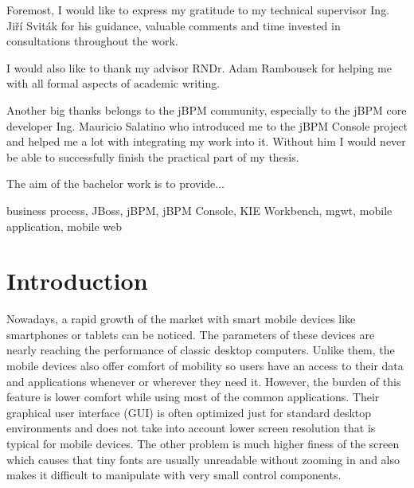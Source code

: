 \documentclass[12pt,oneside,final]{fithesis2}
\begin{document}
\FrontMatter
\ThesisTitlePage

\begin{ThesisDeclaration}
\DeclarationText
\AdvisorName
\end{ThesisDeclaration}

\begin{ThesisThanks}
Foremost, I would like to express my gratitude to my technical supervisor Ing. Jiří Sviták for his guidance, valuable comments and time invested in consultations throughout the work.

I would also like to thank my advisor RNDr. Adam Rambousek for helping me with all formal aspects of academic writing.

Another big thanks belongs to the jBPM community, especially to the jBPM core developer Ing. Mauricio Salatino who introduced me to the jBPM Console project and helped me a lot with integrating my work into it.
Without him I would never be able to successfully finish the practical part of my thesis.
\end{ThesisThanks}

\begin{ThesisAbstract}
The aim of the bachelor work is to provide...
\end{ThesisAbstract}

\begin{ThesisKeyWords}
business process, JBoss, jBPM, jBPM Console, KIE Workbench, mgwt, mobile application, mobile web
\end{ThesisKeyWords}

\tableofcontents

\MainMatter
\chapter{Introduction}
Nowadays, a rapid growth of the market with smart mobile devices like smartphones or tablets can be noticed.
The parameters of these devices are nearly reaching the performance of classic desktop computers.
Unlike them, the mobile devices also offer comfort of mobility so users have an access to their data and applications whenever or wherever they need it.
However, the burden of this feature is lower comfort while using most of the common applications.
Their graphical user interface (GUI) is often optimized just for standard desktop environments and does not take into account lower screen resolution that is typical for mobile devices.
The other problem is much higher finess of the screen which causes that tiny fonts are usually unreadable without zooming in and also makes it difficult to manipulate with very small control components.
\end{document}
